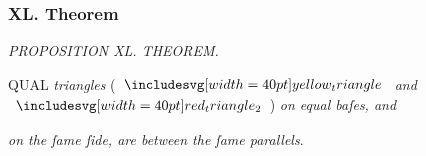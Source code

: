 \documentclass[11pt,preview]{standalone}
\begin{document}
\subsubsection{XL. Theorem}

\begin{minipage}[t]{0.55\textwidth}
    \begin{center}
        \textit{PROPOSITION XL. THEOREM.}\label{book1pr40} \\
    \end{center}

    \hfill

    \begin{center}
        \raggedright \lettrine[lines=3, loversize=1, nindent=0pt]{}{}QUAL \textit{triangles} (\hspace{-2ex}$\img[0][0][40]{yellow_triangle}$ \textit{and} $\img[0][0][40]{red_triangle_2}$\hspace{-2ex}) \textit{on equal baſes, and}
    \end{center}
    \textit{on the ſame ſide, are between the ſame parallels}.
\end{minipage}%
\hfill
\begin{minipage}[t]{0.43\textwidth}
    \vspace{20pt}
    
\end{minipage}

\hfill
\end{document}
